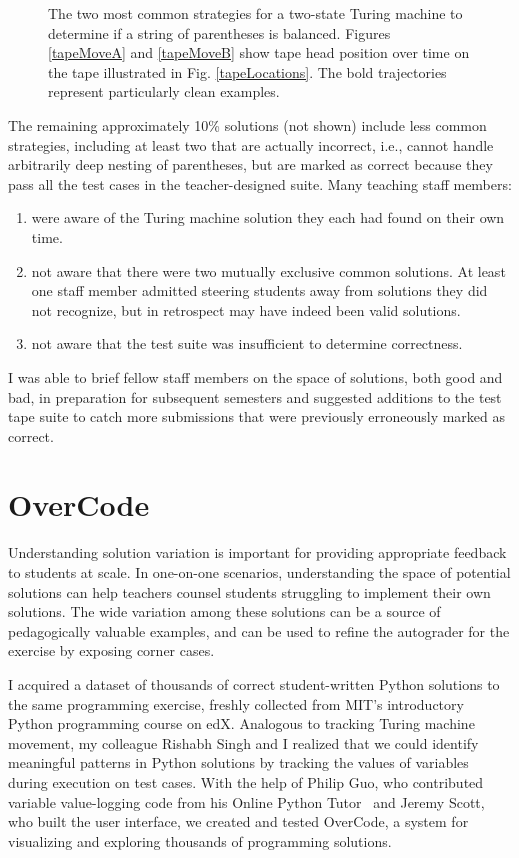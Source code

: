\begin{figure}[p]
\caption{The two most common strategies for a two-state Turing machine to determine if a string of parentheses is balanced. Figures \ref{tapeMoveA} and \ref{tapeMoveB} show tape head position over time on the tape illustrated in Fig. \ref{tapeLocations}. The bold trajectories represent particularly clean examples.}
\label{turingFig}
\end{figure}

The remaining approximately 10\% solutions (not shown) include less common strategies, including at least two that are actually incorrect, i.e., cannot handle arbitrarily deep nesting of parentheses, but are marked as correct because they pass all the test cases in the teacher-designed suite. Many teaching staff members:
\begin{enumerate}
\item were aware of the Turing machine solution they each had found on their own time.
\item not aware that there were two mutually exclusive common solutions. At least one staff member admitted steering students away from solutions they did not recognize, but in retrospect may have indeed been valid solutions.
\item not aware that the test suite was insufficient to determine correctness.
\end{enumerate}

I was able to brief fellow staff members on the space of solutions, both good and bad, in preparation for subsequent semesters and suggested additions to the test tape suite to catch more submissions that were previously erroneously marked as correct.

\section{OverCode}

Understanding solution variation is important for providing appropriate feedback to students at scale. In one-on-one scenarios, understanding the space of potential solutions can help teachers counsel students struggling to implement their own solutions. The wide variation among these solutions can be a source of pedagogically valuable examples, and can be used to refine the autograder for the exercise by exposing corner cases. 

I acquired a dataset of thousands of correct student-written Python solutions to the same programming exercise, freshly collected from MIT's introductory Python programming course on edX. Analogous to tracking Turing machine movement, my colleague Rishabh Singh and I realized that we could identify meaningful patterns in Python solutions by tracking the values of variables during execution on test cases. With the help of Philip Guo, who contributed variable value-logging code from his Online Python Tutor~\cite{pgbovineOPT} and Jeremy Scott, who built the user interface, we created and tested OverCode, a system for visualizing and exploring thousands of programming solutions.


